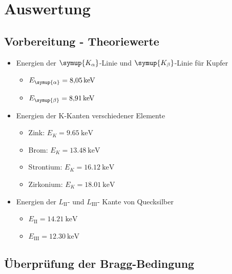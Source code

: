 \section{Auswertung}

\subsection{Vorbereitung - Theoriewerte}
\begin{itemize}
  \item Energien der $\symup{K_\alpha}$-Linie und $\symup{K_\beta}$-Linie für Kupfer \cite[5]{sample4}
  \begin{itemize}
    \item $E_{\symup{\alpha}} = \SI{8,05}{\keV} $
    \item $E_{\symup{\beta}} = \SI{8,91}{\keV}  $
  \end{itemize}
  \item Energien der K-Kanten verschiedener Elemente \cite{sample3}
  \begin{itemize}
    \item Zink: $E_K = \SI{9,65}{\keV}$
    \item Brom: $E_K = \SI{13,48}{\keV}$
    \item Strontium: $E_K = \SI{16,12}{\keV}$
    \item Zirkonium: $E_K = \SI{18,01}{\keV}$
  \end{itemize}
  \item Energien der $L_\text{II}$- und $L_\text{III}$- Kante von Quecksilber \cite{sample2}
  \begin{itemize}
    \item $E_\text{II} = \SI{14,21}{\keV} $
    \item $E_\text{III} = \SI{12,30}{\keV} $
  \end{itemize}
\end{itemize}

\subsection{Überprüfung der Bragg-Bedingung \label{sec:bragg}}

